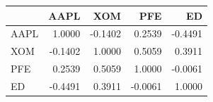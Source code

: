 \begin{tabular}{lrrrr}
\toprule
 & AAPL & XOM & PFE & ED \\
\midrule
AAPL & 1.0000 & -0.1402 & 0.2539 & -0.4491 \\
XOM & -0.1402 & 1.0000 & 0.5059 & 0.3911 \\
PFE & 0.2539 & 0.5059 & 1.0000 & -0.0061 \\
ED & -0.4491 & 0.3911 & -0.0061 & 1.0000 \\
\bottomrule
\end{tabular}
